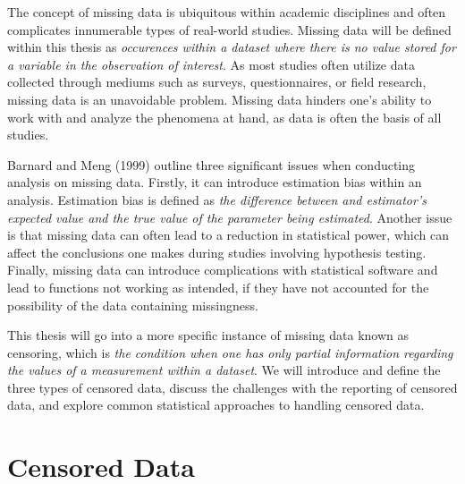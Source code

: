 \documentclass[12pt, twoside]{amherstthesis}
\begin{document}
The concept of missing data is ubiquitous within academic disciplines and often complicates innumerable types of real-world studies. Missing data will be defined within this thesis as \emph{occurences within a dataset where there is no value stored for a variable in the observation of interest}. As most studies often utilize data collected through mediums such as surveys, questionnaires, or field research, missing data is an unavoidable problem. Missing data hinders one's ability to work with and analyze the phenomena at hand, as data is often the basis of all studies.

Barnard and Meng (1999) outline three significant issues when conducting analysis on missing data. Firstly, it can introduce estimation bias within an analysis. Estimation bias is defined as \emph{the difference between and estimator's expected value and the true value of the parameter being estimated}. Another issue is that missing data can often lead to a reduction in statistical power, which can affect the conclusions one makes during studies involving hypothesis testing. Finally, missing data can introduce complications with statistical software and lead to functions not working as intended, if they have not accounted for the possibility of the data containing missingness.

This thesis will go into a more specific instance of missing data known as censoring, which is \emph{the condition when one has only partial information regarding the values of a measurement within a dataset}. We will introduce and define the three types of censored data, discuss the challenges with the reporting of censored data, and explore common statistical approaches to handling censored data.

\hypertarget{censored_data}{%
\section{Censored Data}\label{censored_data}}
\end{document}
